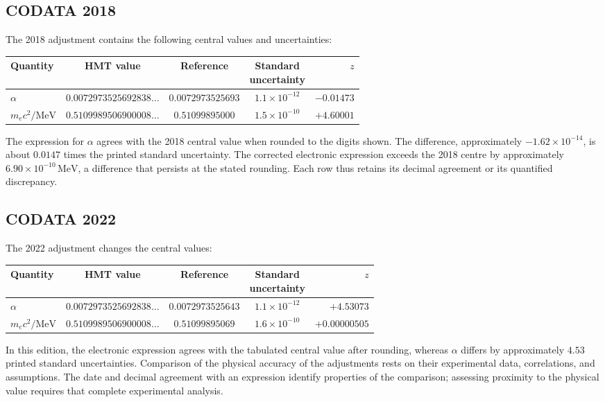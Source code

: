 \subsection{CODATA 2018}

The 2018 adjustment contains the following central values and uncertainties\cite{codata2018}:
\begin{center}
\begin{tabular}{@{}lcccr@{}}\toprule
Quantity&HMT value&Reference&\shortstack{Standard\\uncertainty}&\(z\)\\\midrule
\(\alpha\)&\(0.0072973525692838\ldots\)&\(0.0072973525693\)&\(1.1\times10^{-12}\)&\(-0.01473\)\\
\(m_ec^2/\mathrm{MeV}\)&\(0.5109989506900008\ldots\)&\(0.51099895000\)&\(1.5\times10^{-10}\)&\(+4.60001\)\\\bottomrule
\end{tabular}
\end{center}
The expression for \(\alpha\) agrees with the 2018 central value when rounded to the digits shown. The difference, approximately \(-1.62\times10^{-14}\), is about \(0.0147\) times the printed standard uncertainty. The corrected electronic expression exceeds the 2018 centre by approximately \(6.90\times10^{-10}\,\mathrm{MeV}\), a difference that persists at the stated rounding. Each row thus retains its decimal agreement or its quantified discrepancy.



\subsection{CODATA 2022}

The 2022 adjustment changes the central values\cite{codata2022}:
\begin{center}
\begin{tabular}{@{}lcccr@{}}\toprule
Quantity&HMT value&Reference&\shortstack{Standard\\uncertainty}&\(z\)\\\midrule
\(\alpha\)&\(0.0072973525692838\ldots\)&\(0.0072973525643\)&\(1.1\times10^{-12}\)&\(+4.53073\)\\
\(m_ec^2/\mathrm{MeV}\)&\(0.5109989506900008\ldots\)&\(0.51099895069\)&\(1.6\times10^{-10}\)&\(+0.00000505\)\\\bottomrule
\end{tabular}
\end{center}
In this edition, the electronic expression agrees with the tabulated central value after rounding, whereas \(\alpha\) differs by approximately \(4.53\) printed standard uncertainties. Comparison of the physical accuracy of the adjustments rests on their experimental data, correlations, and assumptions. The date and decimal agreement with an expression identify properties of the comparison; assessing proximity to the physical value requires that complete experimental analysis.


